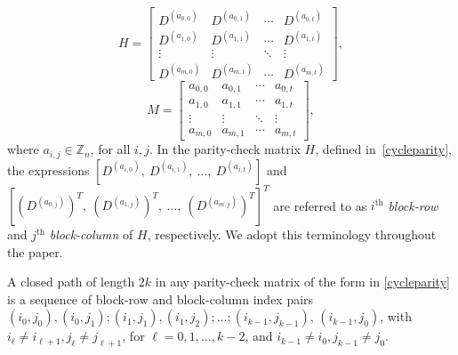\documentclass[conference]{IEEEtran}
\begin{document}
\begin{equation}\label{cycleparity}
H=\begin{bmatrix}
D^{(a_{0,0})} & D^{(a_{0,1})}& \cdots & D^{(a_{0,t})} \\
D^{(a_{1,0})} & D^{(a_{1,1})} & \cdots &  D^{(a_{1,t})} \\
\vdots & \vdots & \ddots & \vdots\\
D^{(a_{m,0})} & D^{(a_{m,1})} & \cdots & D^{(a_{m,t})} 
\end{bmatrix}, 
\end{equation}
\begin{equation}\label{modelmatrix}
 	M=\begin{bmatrix}
 		a_{0,0}&a_{0,1}&\cdots &a_{0,t}\\		a_{1,0}&a_{1,1}&\cdots&a_{1,t}\\	
        \vdots&\vdots&\ddots&\vdots\\
 		a_{m,0}&a_{m,1}&\cdots&a_{m,t}	
 	\end{bmatrix},
 \end{equation}
where $a_{i,j}\in\mathbb{Z}_{n}$, for all $i,j$. In the parity-check matrix $H$, defined in~\eqref{cycleparity}, the expressions $[D^{(a_{i,0})},\ D^{(a_{i,1})},\ \ldots,\ D^{(a_{i,t})}]$ and $[(D^{(a_{0,j})})^{T},\ (D^{(a_{1,j})})^{T},\ \ldots,\ (D^{(a_{m,j})})^{T}]^{T}
$ are referred to as $i^{\text{th}}$ \emph{block-row} and $j^{\text{th}}$ \emph{block-column} of $H$, respectively. We adopt this terminology throughout the paper.
      
 A closed path of length $2k$ in any parity-check matrix of the form in \eqref{cycleparity} is a sequence of block-row and block-column index pairs $(i_0, j_0), (i_0, j_1); (i_1, j_1), (i_1, j_2); \ldots ;(i_{k-1}, j_{k-1})$, $ (i_{k-1}, j_0)$, with $i_\ell \neq i_{\ell+1}, j_\ell \neq j_{\ell+1}$, for $\ell = 0, 1, \ldots, k-2$, and  $i_{k-1} \neq i_0, j_{k-1} \neq j_0 $.
 
 
\end{document}
